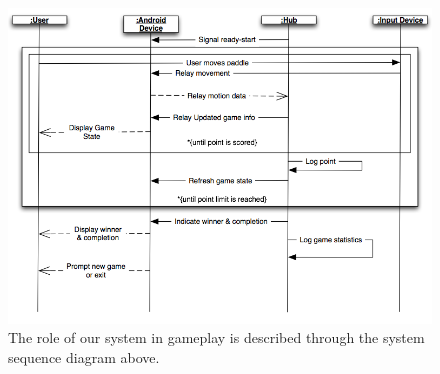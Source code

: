 \documentclass[12pt]{article}
\begin{document}
\begin{figure}
\begin{center}
\includegraphics[scale=.5]{ssd_GamePlay_1.png}
\caption{\label{ssd_GamePlay_1}The role of our system in gameplay is described through the system sequence diagram above.}
\end{center}
\end{figure}
\end{document}
